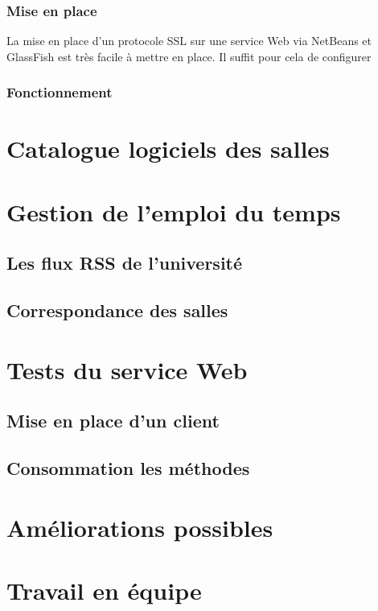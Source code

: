 \subsubsection{Mise en place}

La mise en place d'un protocole SSL sur une service Web via NetBeans et GlassFish est tr\`es facile \`a mettre en place.
Il suffit pour cela de configurer

\subsubsection{Fonctionnement}


\section{Catalogue logiciels des salles}

\section{Gestion de l'emploi du temps}

\subsection{Les flux RSS de l'universit\'e}

\subsection{Correspondance des salles}

\section{Tests du service Web}

\subsection{Mise en place d'un client}

\subsection{Consommation les m\'ethodes}

\section{Am\'eliorations possibles}

\section{Travail en \'equipe}

